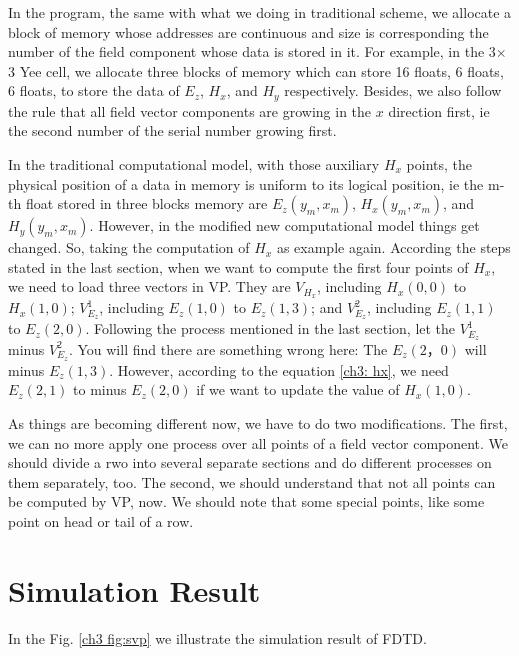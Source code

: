 In the program, the same with what we doing in traditional scheme, we allocate a block of memory whose addresses are continuous and size is corresponding the number of the field component whose data is stored in it. For example, in the 3$\times$3 Yee cell, we allocate three blocks of memory which can store 16 floats, 6 floats, 6 floats, to store the data of $E_z$, $H_x$, and $H_y$ respectively. Besides, we also follow the rule that all field vector components are growing in the $x$ direction first, ie the second number of the serial number growing first.

In the traditional computational model, with those auxiliary $H_x$ points, the physical position of a data in memory is uniform to its logical position, ie the m-th float stored in three blocks memory are $E_z(y_m,x_m)$, $H_x(y_m,x_m)$, and $H_y(y_m,x_m)$. However, in the modified new computational model things get changed. So, taking the computation of $H_x$ as example again. According the steps stated in the last section, when we want to compute the first four points of $H_x$, we need to load three vectors in VP. They are $V_{H_x}$, including $H_x(0,0)$ to $H_x(1,0)$; $V_{E_z}^1$, including $E_z(1,0)$ to $E_z(1,3)$; and $V_{E_z}^2$, including $E_z(1,1)$ to $E_z(2,0)$. Following the process mentioned in the last section, let the $V_{E_z}^1$ minus $V_{E_z}^2$. You will find there are something wrong here: The $E_z(2，0)$ will minus $E_z(1,3)$. However, according to the equation \eqref{ch3: hx}, we need $E_z(2,1)$ to minus $E_z(2,0)$ if we want to update the value of $H_x(1,0)$.

As things are becoming different now, we have to do two modifications. The first, we can no more apply one process over all points of a field vector component. We should divide a rwo into several separate sections and do different processes on them separately, too. The second, we should understand that not all points can be computed by VP, now. We should note that some special points, like some point on head or tail of a row.

\section{Simulation Result}
In the Fig. \ref{ch3 fig:svp} we illustrate the simulation result of FDTD. 

